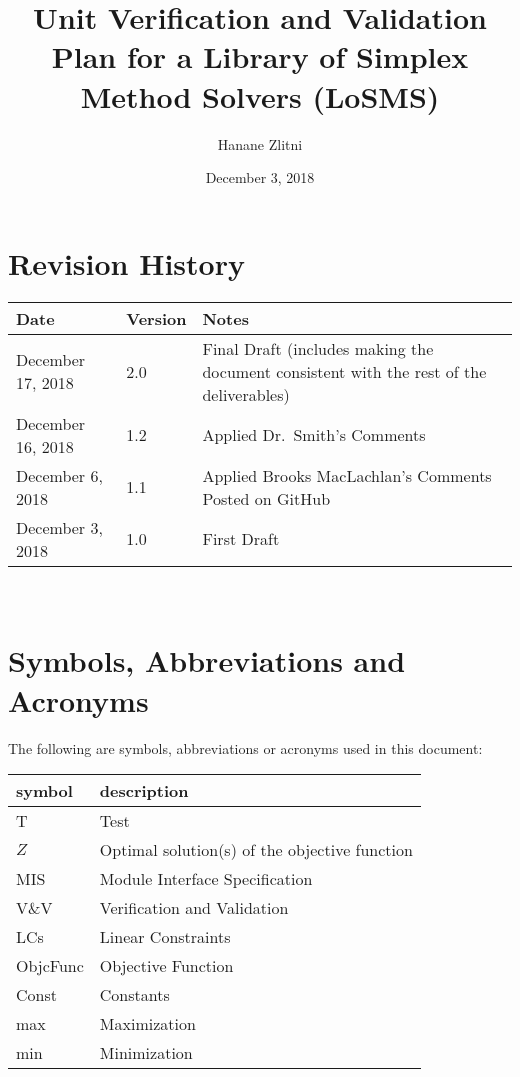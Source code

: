 \documentclass[12pt, titlepage]{article}
\newcommand{\progname}{Library of Simplex Method Solvers}
\newcommand{\famname}{LoSMS}
\begin{document}
\title{Unit Verification and Validation Plan for a \progname{} (\famname{})} 
\author{Hanane Zlitni}
\date{December 3, 2018}
	
\maketitle


\section{Revision History}

\begin{tabularx}{\textwidth}{p{3cm}p{2cm}X}
\toprule {\bf Date} & {\bf Version} & {\bf Notes}\\
\midrule
December 17, 2018 & 2.0 & Final Draft (includes making the document consistent 
with the rest of the deliverables)\\
December 16, 2018 & 1.2 & Applied Dr.~Smith’s Comments\\
December 6, 2018 & 1.1 & Applied Brooks MacLachlan's Comments Posted on GitHub\\
December 3, 2018 & 1.0 & First Draft\\
\bottomrule
\end{tabularx}

~\newpage

\tableofcontents

\listoftables

\newpage

\section{Symbols, Abbreviations and Acronyms}

The following are symbols, abbreviations or acronyms used in this document: \\

\renewcommand{\arraystretch}{1.2}
\begin{tabular}{l l} 
  \toprule		
  \textbf{symbol} & \textbf{description}\\
  \midrule 
  T & Test\\
  $Z$ & Optimal solution(s) of the objective function\\
  MIS & Module Interface Specification\\
  V\&V & Verification and Validation\\
  LCs & Linear Constraints\\
  ObjcFunc & Objective Function\\
  Const & Constants\\
  max & Maximization\\
  min & Minimization\\
  \bottomrule
\end{tabular}\\
\end{document}

